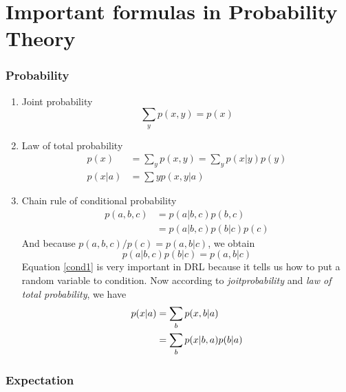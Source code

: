 \part{Important formulas in Probability Theory}

\section{Probability}

\begin{enumerate}

\item
  Joint probability
  \begin{equation*}
    \sum_{y}p(x,y)=p(x)
  \end{equation*}
\item
  Law of total probability
  \begin{align*}
    p(x) &= \sum_{y}p(x,y) = \sum_{y}p(x|y)p(y) \\
    p(x|a) &= \sum{y}p(x,y|a)
  \end{align*}
\item
  Chain rule of conditional probability
  \begin{align*}
    p(a,b,c) &= p(a|b,c)p(b,c) \\
    &= p(a|b,c)p(b|c)p(c)
  \end{align*}
  And because $p(a,b,c)/p(c)=p(a,b|c)$, we obtain
  \begin{equation}
    \label{cond1}
    p(a|b,c)p(b|c) = p(a,b|c)
  \end{equation}
  Equation \ref{cond1} is very important in DRL because it tells us how to put a random variable to condition. Now
  according to \emph{joitprobability} and \emph{law of total probability}, we have
  \begin{align}
    p(x|a) &= \sum_{b}p(x,b|a) \notag \\
    &= \sum_{b}p(x|b,a)p(b|a)
  \end{align}
\end{enumerate}

\section{Expectation}

